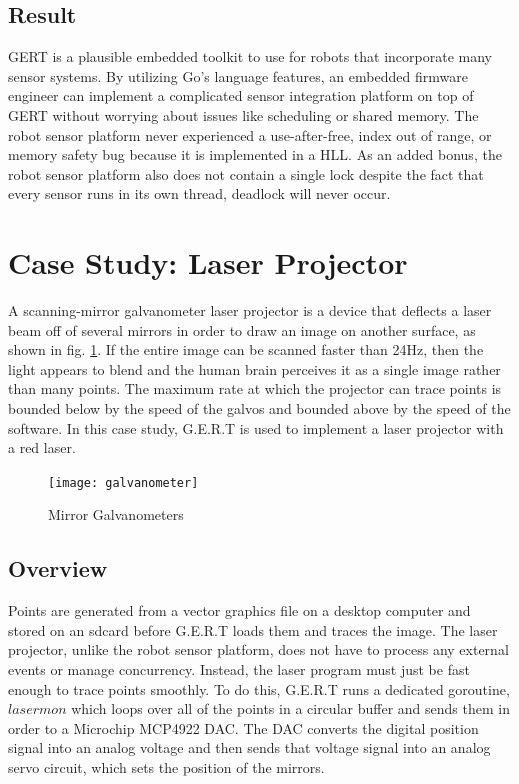\subsection{Result}
GERT is a plausible embedded toolkit to use for robots that incorporate many sensor systems.
By utilizing Go's language features, an embedded firmware engineer can implement a complicated sensor integration
platform on top of GERT without worrying about issues like scheduling or shared memory. The robot sensor platform
never experienced a use-after-free, index out of range, or memory safety bug because it is implemented in a HLL.
As an added bonus, the robot sensor platform also does not contain a single lock despite the fact that every sensor
runs in its own thread, deadlock will never occur.



\section{Case Study: Laser Projector}\label{sec:laser}
A scanning-mirror galvanometer laser projector is a device that deflects a laser beam off of several mirrors in
order to draw an image on another surface, as shown in fig. \ref{fig:galvos}. If the entire image can be scanned faster than 24Hz, then the light appears
to blend and the human brain perceives it as a single image rather than many points. The maximum rate at which the
projector can trace points is bounded below by the speed of the galvos and bounded above by the speed of the software.
In this case study, G.E.R.T is used to implement a laser projector with a red laser.

\begin{figure}[h]
\begin{center}
  \texttt{[image: galvanometer]}
\end{center}
  \caption{Mirror Galvanometers} \label{fig:galvos}
\end{figure}

\subsection{Overview}
Points are generated from a vector graphics file on a desktop computer and stored
on an sdcard before G.E.R.T loads them and traces the image. The laser projector,
unlike the robot sensor platform, does not have to process any external events or
manage concurrency.
Instead, the laser program must just be fast enough to trace points smoothly.
To do this, G.E.R.T runs a dedicated goroutine, $lasermon$ which loops over all of the points
in a circular buffer and sends them in order to a Microchip MCP4922 DAC. The
DAC converts the digital position signal into an analog voltage and then
sends that voltage signal into an analog servo circuit, which sets the position
of the mirrors.

